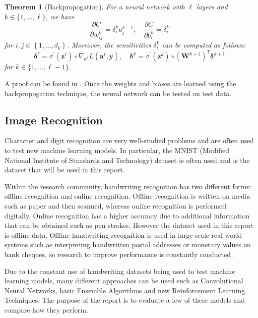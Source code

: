 \documentclass[a4paper,11pt]{article}
\theoremstyle{plain} %
\newtheorem{thm}{Theorem}[section]
\theoremstyle{definition} %
\theoremstyle{remark} %
\begin{document}
\begin{thm}[Backpropogation] For a neural network with $\ell$ layers and $k \in\{1, \ldots, \ell\}$, we have
$$
\frac{\partial C}{\partial w_{i j}^k}=\delta_i^k a_j^{k-1}, \quad \frac{\partial C}{\partial b_i^k}=\delta_i^k
$$
for $i, j \in\left\{1, \ldots, d_k\right\}$. Moreover, the sensitivities $\delta_i^k$ can be computed as follows:
$$
\boldsymbol{\delta}^{\ell}=\sigma^{\prime}\left(\boldsymbol{z}^{\ell}\right) \circ \nabla_{\boldsymbol{a}^{\ell}} L\left(\boldsymbol{a}^{\ell}, \boldsymbol{y}\right), \quad \boldsymbol{\delta}^k=\sigma^{\prime}\left(\boldsymbol{z}^k\right) \circ\left(\boldsymbol{W}^{k+1}\right)^T \boldsymbol{\delta}^{k+1}
$$
for $k \in\{1, \ldots, \ell-1\}$.
\end{thm}

A proof can be found in . Once the weights and biases are learned using the backpropogation technique, the neural network can be tested on test data. 

\subsection{Image Recognition}

Character and digit recognition are very well-studied problems and are often used to test new machine learning models. In particular, the
MNIST (Modified National Institute of Standards and Technology) dataset is often used and is the dataset that will be used in this report. 

Within the research community, handwriting recognition has
two different forms: offline recognition and online recognition. Offline recognition is written on media such as paper and then scanned, whereas online recognition is performed digitally. Online recognition has a higher accuracy due to additional information that can be obtained such as pen strokes. However the dataset used in this report is offline data. Offline
handwriting recognition is used in large-scale real-world
systems such as interpreting handwritten postal addresses
or monetary values on bank cheques, so research to improve performance is constantly conducted \citep{kukreja2022machine}.

Due to the constant use of handwriting datasets being used to test machine learning models, many different approaches can be used such as Convolutional Neural Networks, basic Ensemble Algorithms and new Reinforcement Learning Techniques. The purpose of the report is to evaluate a few of these models and compare how they perform.
\end{document}
